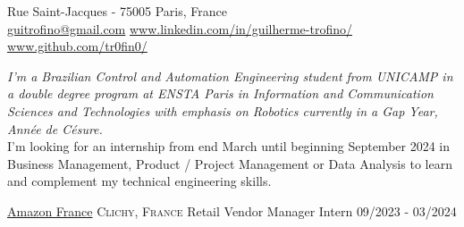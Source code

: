 \documentclass[10pt, a4paper]{article}
\begin{document}
 



 Rue Saint-Jacques - 75005 Paris, France\\         %
\href{mailto:guitrofino@gmail.com}{guitrofino@gmail.com}\bull   %
\href{https://www.linkedin.com/in/guilherme-trofino/}{www.linkedin.com/in/guilherme-trofino/}\bull %
\href{https://github.com/tr0fin0}{www.github.com/tr0fin0/}       %

\spacedhrule{0.9em}{-0.4em}



\begin{multicols}{2}
\noindent \textit{I'm a Brazilian Control and Automation Engineering student from UNICAMP in a double degree program at ENSTA Paris in Information and Communication Sciences and Technologies with emphasis on Robotics currently in a Gap Year, Année de Césure.}\\
\noindent I'm looking for an internship from end March until beginning September 2024 in Business Management, Product / Project Management or Data Analysis to learn and complement my technical engineering skills.
\end{multicols}

\spacedhrule{0.5em}{-0.4em}



\headedsection
    {\href{https://www.aboutamazon.fr/}{Amazon France}}
    {\textsc{Clichy, France}}
    {
        \headedsubsection
        {Retail Vendor Manager Intern}
        {09/2023 - 03/2024}
        {}
    }
\end{document}
